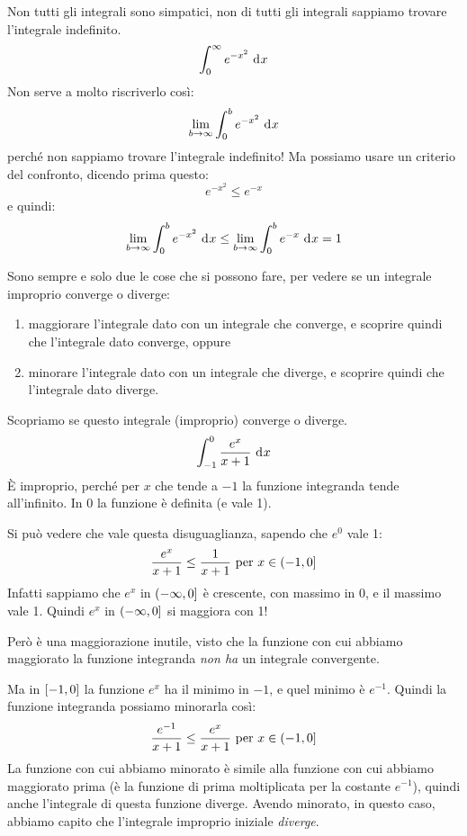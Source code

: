 Non tutti gli integrali sono simpatici, non di tutti gli integrali sappiamo trovare l'integrale indefinito.
\[
\int_{0}^{\infty} e^{-x^2} \dx
\]
Non serve a molto riscriverlo cos\`i:
\[
\lim_{b \to \infty} \int_{0}^{b} e^{-x^2} \dx
\]
perch\'e non sappiamo trovare l'integrale indefinito! Ma possiamo usare un criterio del confronto, dicendo prima questo:
\[
e^{-x^2} \le e^{-x}
\]
e quindi:
\[
\lim_{b \to \infty} \int_{0}^{b} e^{-x^2} \dx \le
\lim_{b \to \infty} \int_{0}^{b} e^{-x} \dx = 1
\]

Sono sempre e solo due le cose che si possono fare, per vedere se un integrale improprio converge o diverge:
\begin{enumerate}
    \item maggiorare l'integrale dato con un integrale che converge, e scoprire quindi che l'integrale dato converge, oppure
    \item minorare l'integrale dato con un integrale che diverge, e scoprire quindi che l'integrale dato diverge.
\end{enumerate}

\begin{exmp}
Scopriamo se questo integrale (improprio) converge o diverge.
\[
\int_{-1}^{0} \frac{e^x}{x+1} \dx
\]
\`E improprio, perch\'e per $x$ che tende a $-1$ la funzione integranda tende all'infinito. In 0 la funzione \`e definita (e vale 1).

Si pu\`o vedere che vale questa disuguaglianza, sapendo che $e^0$ vale 1:
\[
\frac{e^x}{x+1} \le \frac{1}{x+1} \text{ per } x \in \left( {-1}, {0} \right]
\]
Infatti sappiamo che $e^x$ in $\left( {-\infty}, {0} \right]$ \`e crescente, con massimo in $0$, e il massimo vale 1. Quindi $e^x$ in $\left( {-\infty}, {0} \right]$ si maggiora con 1!

Per\`o \`e una maggiorazione inutile, visto che la funzione con cui abbiamo maggiorato la funzione integranda \emph{non ha} un integrale convergente.

Ma in $\left[ {-1}, {0} \right]$ la funzione $e^x$ ha il minimo in $-1$, e quel minimo \`e $e^{-1}$. Quindi la funzione integranda possiamo minorarla cos\`i:
\[
\frac{e^{-1}}{x+1} \le \frac{e^x}{x+1} \text{ per } x \in \left( {-1}, {0} \right]
\]
La funzione con cui abbiamo minorato \`e simile alla funzione con cui abbiamo maggiorato prima (\`e la funzione di prima moltiplicata per la costante $e^{-1}$), quindi anche l'integrale di questa funzione diverge. Avendo minorato, in questo caso, abbiamo capito che l'integrale improprio iniziale \emph{diverge}.
\end{exmp}

